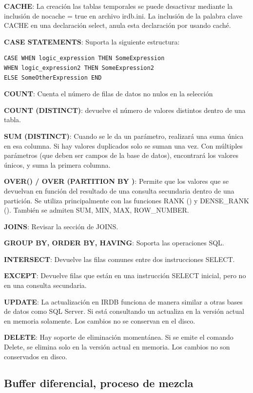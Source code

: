 \documentclass{acmart}
\begin{document}
\textbf{CACHE}: La creación las tablas temporales se puede desactivar mediante la inclusión de nocache = true en
archivo irdb.ini. La inclusión de la palabra clave CACHE en una declaración select, anula esta declaración por
usando caché.

\textbf{CASE STATEMENTS}: Suporta la siguiente estructura:
\begin{verbatim}
CASE WHEN logic_expression THEN SomeExpression
WHEN logic_expression2 THEN SomeExpression2
ELSE SomeOtherExpression END
\end{verbatim}

\textbf{COUNT}: Cuenta el número de filas de datos no nulos en la selección

\textbf{COUNT (DISTINCT)}: devuelve el número de valores distintos dentro de una tabla.

\textbf{SUM (DISTINCT)}: Cuando se le da un parámetro, realizará una suma única en esa columna. Si hay
valores duplicados solo se suman una vez. Con múltiples parámetros (que deben ser campos de la base de datos), encontrará los valores únicos, y suma la primera columna.

\textbf{OVER() / OVER (PARTITION BY )}: Permite que los valores que se devuelvan en función del resultado de una consulta secundaria dentro de una partición. Se utiliza principalmente con las funciones RANK () y DENSE\_RANK (). También se admiten SUM, MIN, MAX, ROW\_NUMBER.

\textbf{JOINS}: Revisar la sección de JOINS.

\textbf{GROUP BY, ORDER BY, HAVING}: Soporta las operaciones SQL.

\textbf{INTERSECT}: Devuelve las filas comunes entre dos instrucciones SELECT.

\textbf{EXCEPT}: Devuelve filas que están en una instrucción SELECT inicial, pero no en una consulta secundaria.

\textbf{UPDATE}: La actualización en IRDB funciona de manera similar a otras bases de datos como SQL Server. Si está consultando un actualiza en la versión actual en memoria solamente. Los cambios no se conservan en el disco.

\textbf{DELETE}: Hay soporte de eliminación momentánea. Si se emite el comando Delete, se elimina solo en la versión actual en memoria. Los cambios no son conservados en disco.

\subsection{Buffer diferencial, proceso de mezcla}
\end{document}
